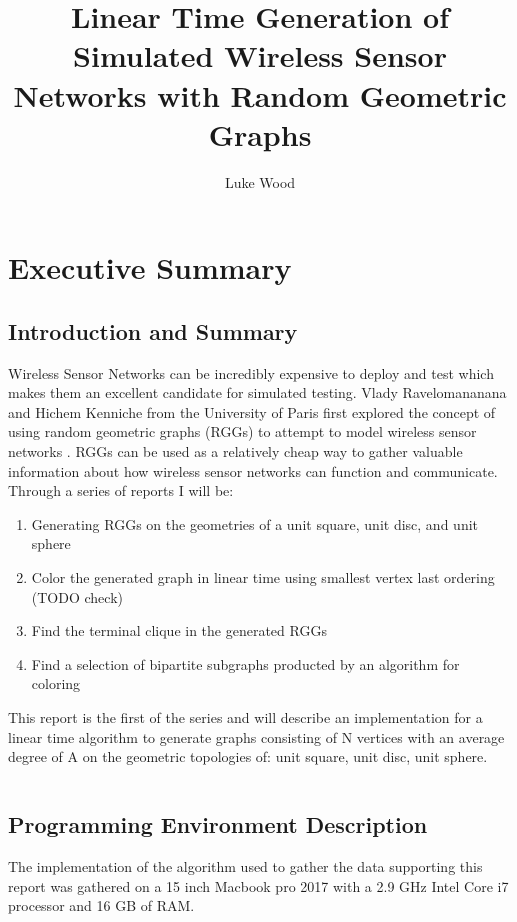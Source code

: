 \documentclass{article}
\begin{document}
  \title{Linear Time Generation of Simulated Wireless Sensor Networks with Random Geometric Graphs}
  \author{Luke Wood}
  \maketitle

  \section{Executive Summary}
  \subsection{Introduction and Summary}
	Wireless Sensor Networks can be incredibly expensive to deploy and test which makes them an excellent candidate for simulated testing.
	Vlady Ravelomananana and Hichem Kenniche from the University of Paris first explored the concept of using random geometric graphs (RGGs) to attempt to model wireless sensor networks \cite{kenniche2010random}.
	RGGs can be used as a relatively cheap way to gather valuable information about how wireless sensor networks can function and communicate.
	Through a series of reports	I will be:
	\begin{enumerate}
		\item Generating RGGs on the geometries of a unit square, unit disc, and unit sphere
		\item Color the generated graph in linear time using smallest vertex last ordering (TODO check)
		\item Find the terminal clique in the generated RGGs
		\item Find a selection of bipartite subgraphs producted by an algorithm for coloring
	\end{enumerate}
	This report is the first of the series and  will describe an implementation for a linear time algorithm to generate graphs consisting of N vertices with an average degree of A on the geometric topologies of: unit square, unit disc, unit sphere.

	\begin{tabular}{ |c|c|c| }

	\end{tabular}

  \subsection{Programming Environment Description}
  	The implementation of the algorithm used to gather the data supporting this report was gathered on a 15 inch Macbook pro 2017 with a 2.9 GHz Intel Core i7 processor and 16 GB of RAM.
\end{document}
